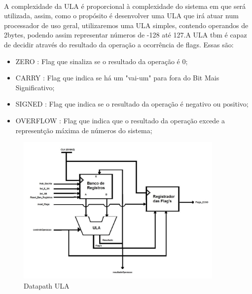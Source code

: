 \documentclass{report}
\begin{document}
    
\paragraph{}
    A complexidade da ULA é proporcional à complexidade do sistema em que será utilizada, assim, como o propósito é desenvolver uma ULA que irá atuar num processador de uso geral, utilizaremos uma ULA simples, contendo operandos de 2bytes, podendo assim representar números de -128 até 127.A ULA tbm é capaz de decidir através do resultado da operação a ocorrência de flags. Essas são:
    
    \begin{itemize}
    \item ZERO : Flag que sinaliza se o resultado da operação é 0;
    \item CARRY : Flag que indica se há um "vai-um" para fora do Bit Mais Significativo;
    \item SIGNED : Flag que indica se o resultado da operação é negativo ou positivo;
    \item OVERFLOW : Flag que indica que o resultado da operação excede a representção máxima de números do sistema;
    \end{itemize}

\begin{figure}[H] \centering \includegraphics[width=0.9\textwidth]{datapathrs123.png}                \caption{Datapath ULA} \label{fig:mesh1} 
    \end{figure}
\end{document}
